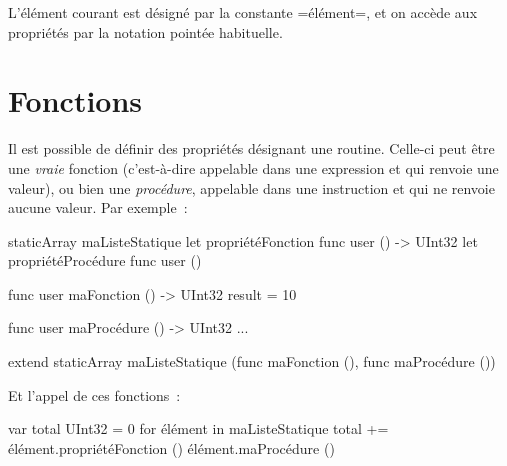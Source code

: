 L'élément courant est désigné par la constante \omnibus=élément=, et on accède aux propriétés par la notation pointée habituelle.








\section{Fonctions}

Il est possible de définir des propriétés désignant une routine. Celle-ci peut être une \emph{vraie} fonction (c'est-à-dire appelable dans une expression et qui renvoie une valeur), ou bien une \emph{procédure}, appelable dans une instruction et qui ne renvoie aucune valeur. Par exemple~:

\begin{OMNIBUS}
staticArray maListeStatique {
  let propriétéFonction func user () -> UInt32
  let propriétéProcédure func user ()
}

func user maFonction () -> UInt32 {
  result = 10
}

func user maProcédure () -> UInt32 {
  ...
}

extend staticArray maListeStatique (func maFonction (), func maProcédure ())

\end{OMNIBUS}

Et l'appel de ces fonctions~:
\begin{OMNIBUS}
var total UInt32 = 0
for élément in maListeStatique {
  total += élément.propriétéFonction ()
  élément.maProcédure ()
}
\end{OMNIBUS}




